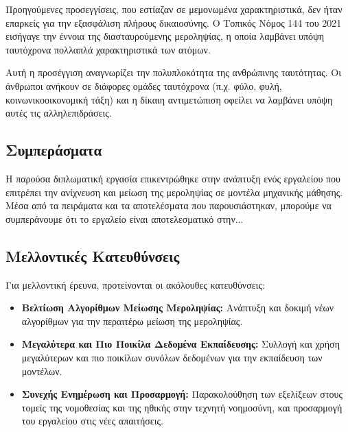 \documentclass[12pt,twoside]{article}
\newcommand{\en}{\selectlanguage{english}}
\newcommand{\gr}{\selectlanguage{greek}}
\begin{document}
Προηγούμενες προσεγγίσεις, που εστίαζαν σε μεμονωμένα χαρακτηριστικά, δεν ήταν επαρκείς για την εξασφάλιση πλήρους δικαιοσύνης. Ο Τοπικός Νόμος 144 του 2021 εισήγαγε την έννοια της διασταυρούμενης μεροληψίας, η οποία λαμβάνει υπόψη ταυτόχρονα πολλαπλά χαρακτηριστικά των ατόμων.

Αυτή η προσέγγιση αναγνωρίζει την πολυπλοκότητα της ανθρώπινης ταυτότητας. Οι άνθρωποι ανήκουν σε διάφορες ομάδες ταυτόχρονα (π.χ. φύλο, φυλή, κοινωνικοοικονομική τάξη) και η δίκαιη αντιμετώπιση οφείλει να λαμβάνει υπόψη αυτές τις αλληλεπιδράσεις.

\subsection{Συμπεράσματα}
Η παρούσα διπλωματική εργασία επικεντρώθηκε στην ανάπτυξη ενός εργαλείου που επιτρέπει την ανίχνευση και μείωση της μεροληψίας σε μοντέλα μηχανικής μάθησης. Μέσα από τα πειράματα και τα αποτελέσματα που παρουσιάστηκαν, μπορούμε να συμπεράνουμε ότι το εργαλείο είναι αποτελεσματικό στην...

\subsection{Μελλοντικές Κατευθύνσεις}
Για μελλοντική έρευνα, προτείνονται οι ακόλουθες κατευθύνσεις:

\begin{itemize}
    \item \textbf{Βελτίωση Αλγορίθμων Μείωσης Μεροληψίας:} Ανάπτυξη και δοκιμή νέων αλγορίθμων για την περαιτέρω μείωση της μεροληψίας.
    \item \textbf{Μεγαλύτερα και Πιο Ποικίλα Δεδομένα Εκπαίδευσης:} Συλλογή και χρήση μεγαλύτερων και πιο ποικίλων συνόλων δεδομένων για την εκπαίδευση των μοντέλων.
    \item \textbf{Συνεχής Ενημέρωση και Προσαρμογή:} Παρακολούθηση των εξελίξεων στους τομείς της νομοθεσίας και της ηθικής στην τεχνητή νοημοσύνη, και προσαρμογή του εργαλείου στις νέες απαιτήσεις.
\end{itemize}

\newpage
\gr
\en
\thispagestyle{plain}
\renewcommand{\bibname}{\gr Βιβλιογραφία}

\end{document}
